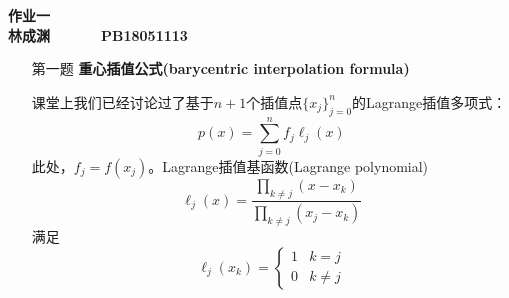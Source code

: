 \documentclass[12pt,a4paper,utf8]{ctexart}
\begin{document}


\begin{center}
\textbf{作业一}\\
\textbf{林成渊 ~~~~~ PB18051113 ~~~~~ \zhtoday}\\
\end{center}
\textit{}
\vspace{\baselineskip}

\begin{enumerate}
\item[第一题] \textbf{重心插值公式(barycentric interpolation formula)}  

课堂上我们已经讨论过了基于$n+1$个插值点$\{x_j\}_{j=0}^n$的Lagrange插值多项式：
\begin{equation}
p(x) = \sum_{j=0}^{n} f_j \ell_j(x) \label{lagrange}
\end{equation}
此处，$f_j = f(x_j)$。Lagrange插值基函数(Lagrange polynomial)
\begin{equation}
\ell_{j}(x)=\frac{\prod_{k \neq j}\left(x-x_{k}\right)}{\prod_{k \neq j}\left(x_{j}-x_{k}\right)} \label{cardinal}
\end{equation}
满足
\begin{equation}
\ell_{j}\left(x_{k}\right)=\left\{\begin{array}{ll}
1 & k=j \\
0 & k \neq j
\end{array}\right. \nonumber
\end{equation}


\end{enumerate}
\end{document}
